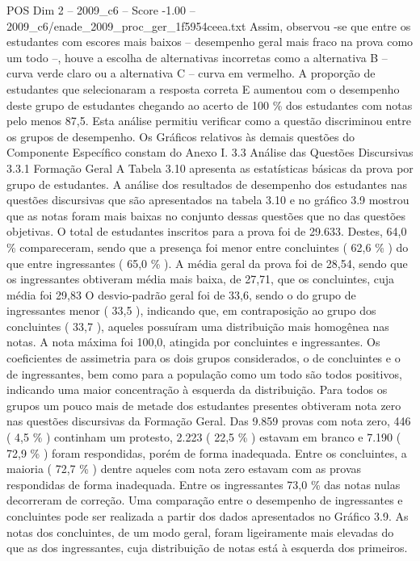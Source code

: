 \begin{textsample}{POS Dim 2 – 2009\_c6 – Score -1.00 – 2009\_c6/enade\_2009\_proc\_ger\_1f5954ceea.txt}
Assim, observou -se que entre os estudantes com escores mais baixos – desempenho geral mais fraco na prova como um todo –, houve a escolha de alternativas incorretas como a alternativa B – curva verde claro ou a alternativa C – curva em vermelho.
A proporção de estudantes que selecionaram a resposta correta E aumentou com o desempenho deste grupo de estudantes chegando ao acerto de 100 \% dos estudantes com notas pelo menos 87,5.
Esta análise permitiu verificar como a questão discriminou entre os grupos de desempenho.
Os Gráficos relativos às demais questões do Componente Específico constam do Anexo I. 3.3 Análise das Questões Discursivas 3.3.1 Formação Geral A Tabela 3.10 apresenta as estatísticas básicas da prova por grupo de estudantes.
A análise dos resultados de desempenho dos estudantes nas questões discursivas que são apresentados na tabela 3.10 e no gráfico 3.9 mostrou que as notas foram mais baixas no conjunto dessas questões que no das questões objetivas.
O total de estudantes inscritos para a prova foi de 29.633.
Destes, 64,0 \% compareceram, sendo que a presença foi menor entre concluintes ( 62,6 \% ) do que entre ingressantes ( 65,0 \% ).
A média geral da prova foi de 28,54, sendo que os ingressantes obtiveram média mais baixa, de 27,71, que os concluintes, cuja média foi 29,83 O desvio-padrão geral foi de 33,6, sendo o do grupo de ingressantes menor ( 33,5 ), indicando que, em contraposição ao grupo dos concluintes ( 33,7 ), aqueles possuíram uma distribuição mais homogênea nas notas.
A nota máxima foi 100,0, atingida por concluintes e ingressantes.
Os coeficientes de assimetria para os dois grupos considerados, o de concluintes e o de ingressantes, bem como para a população como um todo são todos positivos, indicando uma maior concentração à esquerda da distribuição.
Para todos os grupos um pouco mais de metade dos estudantes presentes obtiveram nota zero nas questões discursivas da Formação Geral.
Das 9.859 provas com nota zero, 446 ( 4,5 \% ) continham um protesto, 2.223 ( 22,5 \% ) estavam em branco e 7.190 ( 72,9 \% ) foram respondidas, porém de forma inadequada.
Entre os concluintes, a maioria ( 72,7 \% ) dentre aqueles com nota zero estavam com as provas respondidas de forma inadequada.
Entre os ingressantes 73,0 \% das notas nulas decorreram de correção.
Uma comparação entre o desempenho de ingressantes e concluintes pode ser realizada a partir dos dados apresentados no Gráfico 3.9.
As notas dos concluintes, de um modo geral, foram ligeiramente mais elevadas do que as dos ingressantes, cuja distribuição de notas está à esquerda dos primeiros.

\end{textsample}
